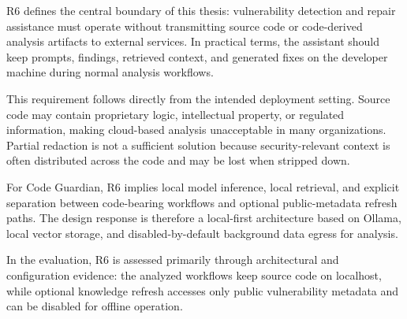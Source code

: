 \label{sec:r6-privacy}

R6 defines the central boundary of this thesis: vulnerability detection and repair assistance must operate without transmitting source code or code-derived analysis artifacts to external services. In practical terms, the assistant should keep prompts, findings, retrieved context, and generated fixes on the developer machine during normal analysis workflows.

This requirement follows directly from the intended deployment setting. Source code may contain proprietary logic, intellectual property, or regulated information, making cloud-based analysis unacceptable in many organizations. Partial redaction is not a sufficient solution because security-relevant context is often distributed across the code and may be lost when stripped down.

For Code Guardian, R6 implies local model inference, local retrieval, and explicit separation between code-bearing workflows and optional public-metadata refresh paths. The design response is therefore a local-first architecture based on Ollama, local vector storage, and disabled-by-default background data egress for analysis.

In the evaluation, R6 is assessed primarily through architectural and configuration evidence: the analyzed workflows keep source code on localhost, while optional knowledge refresh accesses only public vulnerability metadata and can be disabled for offline operation.
